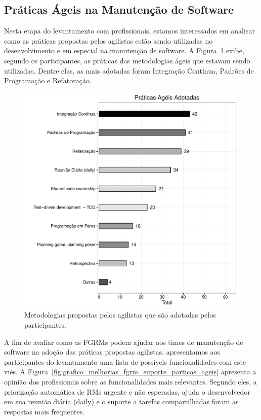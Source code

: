 \subsection{Práticas Ágeis na Manutenção de Software}
\label{sub:práticas_ágeis_na_manutenção_de_software}

Nesta etapa do levantamento com profissionais, estamos interessados em analisar
como as práticas propostas pelos agilistas estão sendo utilizadas no
desenvolvimento e em especial na manutenção de software. A
Figura~\ref{fig:grafico_melhorias_fgrm_praticas_ageis_adotadas} exibe, segundo
os participantes, as práticas das metodologias ágeis que estavam sendo
utilizadas. Dentre elas, as mais adotadas foram Integração Contínua, Padrões de
Programação e Refatoração.

\begin{figure}[htpb]
	\centering
	\includegraphics[width=0.6\linewidth]{./chapter-pesquisa-com-profissionais/img/grafico_melhorias_fgrm_praticas_ageis_adotadas.pdf}
	\caption{Metodologias propostas pelos agilistas que são adotadas pelos
		participantes.}
\label{fig:grafico_melhorias_fgrm_praticas_ageis_adotadas}
\end{figure}

A fim de avaliar como as FGRMs podem ajudar aos times de manutenção de software
na adoção das práticas propostas agilistas, apresentamos aos participantes do
levantamento uma lista de possíveis funcionalidades com este viés. A
Figura~\ref{fig:grafico_melhorias_fgrm_suporte_particas_ageis} apresenta a
opinião dos profissionais sobre as funcionalidades mais relevantes. Segundo
eles, a priorização automática de RMs urgente e não esperadas, ajuda o
desenvolvedor em sua reunião diária (daily) e o suporte a tarefas compartilhadas
foram as respostas mais frequentes.


